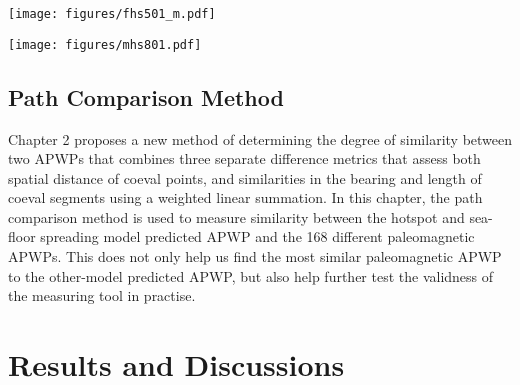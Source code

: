 \begin{figure*}
\centering
\texttt{[image: figures/fhs501\_m.pdf]}
\caption[120 Ma MHM vs FHS predicted APWP of India]{MHM predicted
120 Ma APWP (solid line) for India through the
India\textendash{}Somalia\textendash{}Nubia\textendash{}Mantle plate circuit.
Its age step is 5 Myr. The dashed line is the FHM predicted path shown for
comparison. The inset shows paths for fast moving India and also much slower
moving North America shown in Fig.~\ref{fig-mhsPred}.}\label{fig-mhsPred501}
\end{figure*}

\begin{figure*}
\centering
\texttt{[image: figures/mhs801.pdf]}
\caption[120 Ma MHM vs FHM predicted APWP of Australia]{MHM
predicted 120 Ma APWP (solid line) for Australia through the
Australia\textendash{}East
Antarctica\textendash{}Somalia\textendash{}Nubia\textendash{}Mantle plate
circuit. Its age step is 5 Myr. The dashed line is the FHM predicted path shown
for comparison. The inset shows paths for fast moving India shown in
Fig.~\ref{fig-mhsPred501}, much slower moving North America shown in
Fig.~\ref{fig-mhsPred}, and also relatively intermediate moving
Australia.}\label{fig-mhsPred801}
\end{figure*}

\subsection{Path Comparison Method}

Chapter 2 proposes a new method of determining the degree of similarity between
two APWPs that combines three separate difference metrics that assess both
spatial distance of coeval points, and similarities in the bearing and length of
coeval segments using a weighted linear summation. In this chapter, the path
comparison method is used to measure similarity between the hotspot and
sea-floor spreading model predicted APWP and the 168 different paleomagnetic
APWPs. This does not only help us find the most similar paleomagnetic APWP to
the other-model predicted APWP, but also help further test the validness
of the measuring tool in practise.

\section{Results and Discussions}

